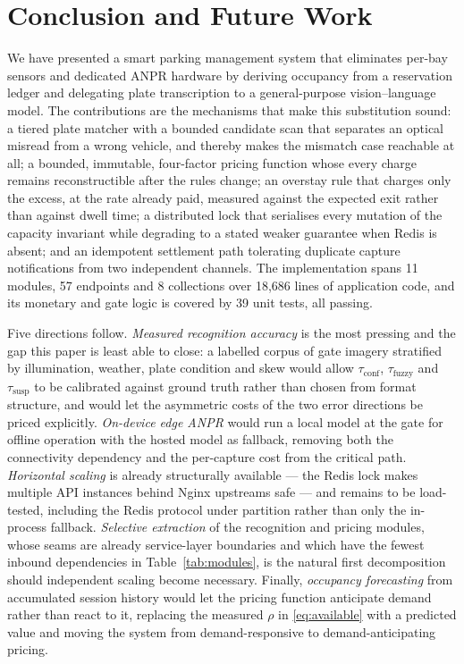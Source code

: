\documentclass[journal,onecolumn,11pt]{IEEEtran}
\begin{document}
\section{Conclusion and Future Work}
\label{sec:conclusion}

We have presented a smart parking management system that eliminates per-bay
sensors and dedicated ANPR hardware by deriving occupancy from a reservation
ledger and delegating plate transcription to a general-purpose vision--language
model. The contributions are the mechanisms that make this substitution sound:
a tiered plate matcher with a bounded candidate scan that separates an optical
misread from a wrong vehicle, and thereby makes the mismatch case reachable at
all; a bounded, immutable, four-factor pricing function whose every charge
remains reconstructible after the rules change; an overstay rule that charges
only the excess, at the rate already paid, measured against the expected exit
rather than against dwell time; a distributed lock that serialises every
mutation of the capacity invariant while degrading to a stated weaker guarantee
when Redis is absent; and an idempotent settlement path tolerating duplicate
capture notifications from two independent channels. The implementation spans
11 modules, 57 endpoints and 8 collections over 18{,}686 lines of application
code, and its monetary and gate logic is covered by 39 unit tests, all passing.

Five directions follow. \emph{Measured recognition accuracy} is the most
pressing and the gap this paper is least able to close: a labelled corpus of
gate imagery stratified by illumination, weather, plate condition and skew
would allow $\tau_{\text{conf}}$, $\tau_{\text{fuzzy}}$ and
$\tau_{\text{susp}}$ to be calibrated against ground truth rather than chosen
from format structure, and would let the asymmetric costs of the two error
directions be priced explicitly. \emph{On-device edge ANPR} would run a local
model at the gate for offline operation with the hosted model as fallback,
removing both the connectivity dependency and the per-capture cost from the
critical path. \emph{Horizontal scaling} is already structurally available ---
the Redis lock makes multiple API instances behind Nginx upstreams safe --- and
remains to be load-tested, including the Redis protocol under partition rather
than only the in-process fallback. \emph{Selective extraction} of the
recognition and pricing modules, whose seams are already service-layer
boundaries and which have the fewest inbound dependencies in
Table~\ref{tab:modules}, is the natural first decomposition should independent
scaling become necessary. Finally, \emph{occupancy forecasting} from
accumulated session history would let the pricing function anticipate demand
rather than react to it, replacing the measured $\rho$ in \eqref{eq:available}
with a predicted value and moving the system from demand-responsive to
demand-anticipating pricing.
\end{document}
